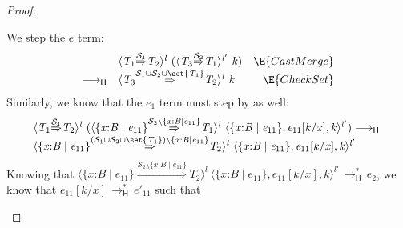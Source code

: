 \documentclass[9pt]{extarticle}
\newcommand{\ottnt}[1]{\mathit{#1}}
\newcommand{\ottsym}[1]{#1}
\begin{document}
{\begin{lemma}
\begin{proof}
{\begin{itemize}
      We step the $\ottnt{e}$ term:
\[ \begin{array}{rlr}
        &  \langle  \ottnt{T_{{\mathrm{1}}}}  \mathord{ \overset{ \mathcal{S}_{{\mathrm{1}}} }{\Rightarrow} }  \ottnt{T_{{\mathrm{2}}}}  \rangle^{ \ottnt{l} } ~   (  \langle  \ottnt{T_{{\mathrm{3}}}}  \mathord{ \overset{ \mathcal{S}_{{\mathrm{2}}} }{\Rightarrow} }  \ottnt{T_{{\mathrm{1}}}}  \rangle^{ \ottnt{l'} } ~  \ottnt{k}  )   & \E{CastMerge} \\
         \longrightarrow _{  \mathsf{H}  }  &  \langle  \ottnt{T_{{\mathrm{3}}}}  \mathord{ \overset{   \mathcal{S}_{{\mathrm{1}}}  \cup  \mathcal{S}_{{\mathrm{2}}}   \cup   \set{  \ottnt{T_{{\mathrm{1}}}}  }   }{\Rightarrow} }  \ottnt{T_{{\mathrm{2}}}}  \rangle^{ \ottnt{l} } ~  \ottnt{k}  & \E{CheckSet} \end{array} \]
Similarly, we know that the $\ottnt{e_{{\mathrm{1}}}}$ term must step by
       as well:
\[ \begin{array}{l}
         \langle  \ottnt{T_{{\mathrm{1}}}}  \mathord{ \overset{ \mathcal{S}_{{\mathrm{1}}} }{\Rightarrow} }  \ottnt{T_{{\mathrm{2}}}}  \rangle^{ \ottnt{l} } ~   (  \langle   \{ \mathit{x} \mathord{:} \ottnt{B} \mathrel{\mid} \ottnt{e_{{\mathrm{11}}}} \}   \mathord{ \overset{  \mathcal{S}_{{\mathrm{2}}}  \setminus   \{ \mathit{x} \mathord{:} \ottnt{B} \mathrel{\mid} \ottnt{e_{{\mathrm{11}}}} \}   }{\Rightarrow} }  \ottnt{T_{{\mathrm{1}}}}  \rangle^{ \ottnt{l} } ~   \langle   \{ \mathit{x} \mathord{:} \ottnt{B} \mathrel{\mid} \ottnt{e_{{\mathrm{11}}}} \}  ,   \ottnt{e_{{\mathrm{11}}}}  [  \ottnt{k} / \mathit{x}  ]  ,  \ottnt{k}  \rangle^{ \ottnt{l'} }   )    \longrightarrow _{  \mathsf{H}  }  {} \\
         \langle   \{ \mathit{x} \mathord{:} \ottnt{B} \mathrel{\mid} \ottnt{e_{{\mathrm{11}}}} \}   \mathord{ \overset{  \ottsym{(}    \mathcal{S}_{{\mathrm{1}}}  \cup  \mathcal{S}_{{\mathrm{2}}}   \cup   \set{  \ottnt{T_{{\mathrm{1}}}}  }    \ottsym{)}  \setminus   \{ \mathit{x} \mathord{:} \ottnt{B} \mathrel{\mid} \ottnt{e_{{\mathrm{11}}}} \}   }{\Rightarrow} }  \ottnt{T_{{\mathrm{2}}}}  \rangle^{ \ottnt{l} } ~   \langle   \{ \mathit{x} \mathord{:} \ottnt{B} \mathrel{\mid} \ottnt{e_{{\mathrm{11}}}} \}  ,   \ottnt{e_{{\mathrm{11}}}}  [  \ottnt{k} / \mathit{x}  ]  ,  \ottnt{k}  \rangle^{ \ottnt{l'} }  
      \end{array} \]      
Knowing that $ \langle   \{ \mathit{x} \mathord{:} \ottnt{B} \mathrel{\mid} \ottnt{e_{{\mathrm{11}}}} \}   \mathord{ \overset{  \mathcal{S}_{{\mathrm{2}}}  \setminus   \{ \mathit{x} \mathord{:} \ottnt{B} \mathrel{\mid} \ottnt{e_{{\mathrm{11}}}} \}   }{\Rightarrow} }  \ottnt{T_{{\mathrm{2}}}}  \rangle^{ \ottnt{l} } ~   \langle   \{ \mathit{x} \mathord{:} \ottnt{B} \mathrel{\mid} \ottnt{e_{{\mathrm{11}}}} \}  ,   \ottnt{e_{{\mathrm{11}}}}  [  \ottnt{k} / \mathit{x}  ]  ,  \ottnt{k}  \rangle^{ \ottnt{l'} }   \,  \longrightarrow ^{*}_{  \mathsf{H}  }  \, \ottnt{e_{{\mathrm{2}}}}$, we know that $ \ottnt{e_{{\mathrm{11}}}}  [  \ottnt{k} / \mathit{x}  ]  \,  \longrightarrow ^{*}_{  \mathsf{H}  }  \, \ottnt{e'_{{\mathrm{11}}}}$ such that

\end{itemize}}
\end{proof}
\end{lemma}}
\end{document}
